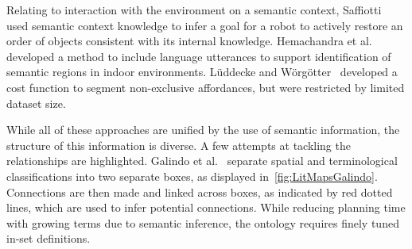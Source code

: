 \documentclass[a4paper,11pt]{article}
\theoremstyle{mytheor}
\begin{document}
Relating to interaction with the environment on a semantic context, Saffiotti~\cite{saffiotti_robots_2011} used semantic context knowledge to infer a goal for a robot to actively restore an order of objects consistent with its internal knowledge. Hemachandra et al.~\cite{hemachandra_learning_2014} developed a method to include language utterances to support identification of semantic regions in indoor environments. Lüddecke and Wörgötter~\cite{luddecke_learning_2017} developed a cost function to segment non-exclusive affordances, but were restricted by limited dataset size.

While all of these approaches are unified by the use of semantic information, the structure of this information is diverse. A few attempts at tackling the relationships are highlighted.
Galindo et al.~\cite{galindo_robot_2008} separate spatial and terminological classifications into two separate boxes, as displayed in~\ref{fig:LitMapsGalindo}. Connections are then made and linked across boxes, as indicated by red dotted lines, which are used to infer potential connections. While reducing planning time with growing terms due to semantic inference, the ontology requires finely tuned in-set definitions.\\
\end{document}
